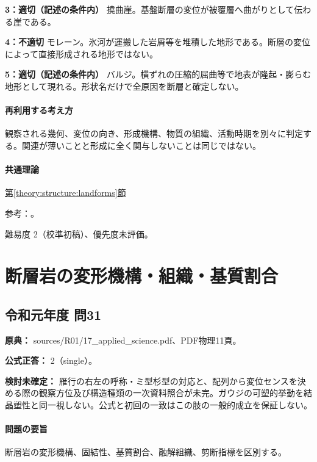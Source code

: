 \noindent\textbf{3：適切（記述の条件内）} 撓曲崖。基盤断層の変位が被覆層へ曲がりとして伝わる崖である。\par

\noindent\textbf{4：不適切} モレーン。氷河が運搬した岩屑等を堆積した地形である。断層の変位によって直接形成される地形ではない。\par

\noindent\textbf{5：適切（記述の条件内）} バルジ。横ずれの圧縮的屈曲等で地表が隆起・膨らむ地形として現れる。形状名だけで全原因を断層と確定しない。\par

\paragraph{再利用する考え方} 観察される幾何、変位の向き、形成機構、物質の組織、活動時期を別々に判定する。関連が薄いことと形成に全く関与しないことは同じではない。

\paragraph{共通理論} \hyperref[theory:structure:landforms]{第\ref*{theory:structure:landforms}節}

\par 参考：\cite{str_moraine}。

\par 難易度 2（校準初稿）、優先度未評価。

\section{断層岩の変形機構・組織・基質割合}

\subsection{令和元年度 問31}
\label{q:r01-reg-applied-31}

\noindent\textbf{原典：} sources/R01/17\_applied\_science.pdf、PDF物理11頁。

\textbf{公式正答：} 2（single）。

\par\textbf{検討未確定：} 雁行の右左の呼称・ミ型杉型の対応と、配列から変位センスを決める際の観察方位及び構造種類の一次資料照合が未完。ガウジの可塑的挙動を結晶塑性と同一視しない。公式と初回の一致はこの肢の一般的成立を保証しない。

\paragraph{問題の要旨} 断層岩の変形機構、固結性、基質割合、融解組織、剪断指標を区別する。

